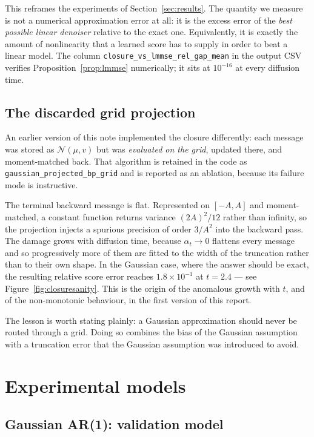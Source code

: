 \documentclass[11pt]{article}
\newcommand{\Normal}{\mathcal{N}}
\begin{document}
This reframes the experiments of Section~\ref{sec:results}. The quantity we measure is
not a numerical approximation error at all: it is the excess error of the \emph{best
possible linear denoiser} relative to the exact one. Equivalently, it is exactly the
amount of nonlinearity that a learned score has to supply in order to beat a linear
model. The column \texttt{closure\_vs\_lmmse\_rel\_gap\_mean} in the output CSV verifies
Proposition~\ref{prop:lmmse} numerically; it sits at \(10^{-16}\) at every diffusion
time.

\subsection{The discarded grid projection}
\label{sec:ablation}

An earlier version of this note implemented the closure differently: each message was
stored as \(\Normal(\mu,v)\) but was \emph{evaluated on the grid}, updated there, and
moment-matched back. That algorithm is retained in the code as
\texttt{gaussian\_projected\_bp\_grid} and is reported as an ablation, because its failure
mode is instructive.

The terminal backward message is flat. Represented on \([-A,A]\) and moment-matched, a
constant function returns variance \((2A)^2/12\) rather than infinity, so the projection
injects a spurious precision of order \(3/A^2\) into the backward pass. The damage grows
with diffusion time, because \(\alpha_t\to0\) flattens every message and so progressively
more of them are fitted to the width of the truncation rather than to their own shape. In
the Gaussian case, where the answer should be exact, the resulting relative score error
reaches \(1.8\times10^{-1}\) at \(t=2.4\) --- see Figure~\ref{fig:closuresanity}. This is
the origin of the anomalous growth with \(t\), and of the non-monotonic behaviour, in the
first version of this report.

The lesson is worth stating plainly: a Gaussian approximation should never be routed
through a grid. Doing so combines the bias of the Gaussian assumption with a truncation
error that the Gaussian assumption was introduced to avoid.

\section{Experimental models}

\subsection{Gaussian AR(1): validation model}
\end{document}
